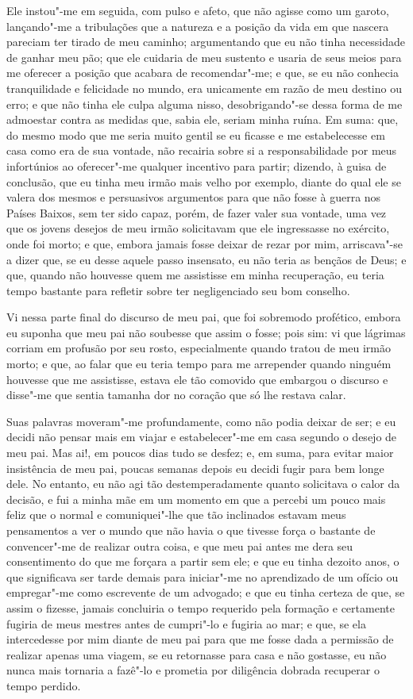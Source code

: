 Ele instou"-me em seguida, com pulso e afeto, que não agisse como um
garoto, lançando"-me a tribulações que a natureza e a posição da vida em
que nascera pareciam ter tirado de meu caminho; argumentando que eu não
tinha necessidade de ganhar meu pão; que ele cuidaria de meu sustento e
usaria de seus meios para me oferecer a posição que acabara de
recomendar"-me; e que, se eu não conhecia tranquilidade e felicidade no
mundo, era unicamente em razão de meu destino ou erro; e que não tinha
ele culpa alguma nisso, desobrigando"-se dessa forma de me admoestar
contra as medidas que, sabia ele, seriam minha ruína. Em suma: que, do
mesmo modo que me seria muito gentil se eu ficasse e me estabelecesse em
casa como era de sua vontade, não recairia sobre si a responsabilidade
por meus infortúnios ao oferecer"-me qualquer incentivo para partir;
dizendo, à guisa de conclusão, que eu tinha meu irmão mais velho por
exemplo, diante do qual ele se valera dos mesmos e persuasivos
argumentos para que não fosse à guerra nos Países Baixos, sem ter sido
capaz, porém, de fazer valer sua vontade, uma vez que os jovens desejos
de meu irmão solicitavam que ele ingressasse no exército, onde foi
morto; e que, embora jamais fosse deixar de rezar por mim, arriscava"-se
a dizer que, se eu desse aquele passo insensato, eu não teria as bençãos
de Deus; e que, quando não houvesse quem me assistisse em minha
recuperação, eu teria tempo bastante para refletir sobre ter
negligenciado seu bom conselho.

Vi nessa parte final do discurso de meu pai, que foi sobremodo
profético, embora eu suponha que meu pai não soubesse que assim o fosse;
pois sim: vi que lágrimas corriam em profusão por seu rosto,
especialmente quando tratou de meu irmão morto; e que, ao falar que eu
teria tempo para me arrepender quando ninguém houvesse que me
assistisse, estava ele tão comovido que embargou o discurso e disse"-me
que sentia tamanha dor no coração que só lhe restava calar.

Suas palavras moveram"-me profundamente, como não podia deixar de ser; e
eu decidi não pensar mais em viajar e estabelecer"-me em casa segundo o
desejo de meu pai. Mas ai!, em poucos dias tudo se desfez; e, em suma,
para evitar maior insistência de meu pai, poucas semanas depois eu
decidi fugir para bem longe dele. No entanto, eu não agi tão
destemperadamente quanto solicitava o calor da decisão, e fui a minha
mãe em um momento em que a percebi um pouco mais feliz que o normal e
comuniquei"-lhe que tão inclinados estavam meus pensamentos a ver o mundo
que não havia o que tivesse força o bastante de convencer"-me de realizar
outra coisa, e que meu pai antes me dera seu consentimento do que me
forçara a partir sem ele; e que eu tinha dezoito anos, o que significava
ser tarde demais para iniciar"-me no aprendizado de um ofício ou
empregar"-me como escrevente de um advogado; e que eu tinha certeza de
que, se assim o fizesse, jamais concluiria o tempo requerido pela
formação e certamente fugiria de meus mestres antes de cumpri"-lo e
fugiria ao mar; e que, se ela intercedesse por mim diante de meu pai
para que me fosse dada a permissão de realizar apenas uma viagem, se eu
retornasse para casa e não gostasse, eu não nunca mais tornaria a
fazê"-lo e prometia por diligência dobrada recuperar o tempo perdido.

